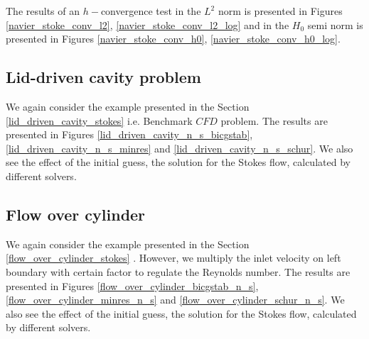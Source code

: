 \documentclass[a4paper]{book}
\begin{document}
The results of an $h-$convergence test in the $L^2$ norm is presented in Figures \ref{navier_stoke_conv_l2}, \ref{navier_stoke_conv_l2_log} and in the $H_0$ semi norm is presented in Figures \ref{navier_stoke_conv_h0}, \ref{navier_stoke_conv_h0_log}. \\

\subsection{Lid-driven cavity problem} \label{lid_driven_cavity_navier_stokes}

We again consider the example presented in the Section \ref{lid_driven_cavity_stokes} i.e. Benchmark $CFD$ problem. The results are presented in Figures \ref{lid_driven_cavity_n_s_bicgstab}, \ref{lid_driven_cavity_n_s_minres} and \ref{lid_driven_cavity_n_s_schur}. We also see the effect of the initial guess, the solution for the Stokes flow, calculated by different solvers.

\subsection{Flow over cylinder} \label{flow_over_cylinder_navier_stokes}

We again consider the example presented in the Section \ref{flow_over_cylinder_stokes} . However, we multiply the inlet velocity on left boundary with certain factor to regulate the Reynolds number. The results are presented in Figures \ref{flow_over_cylinder_bicgstab_n_s}, \ref{flow_over_cylinder_minres_n_s} and \ref{flow_over_cylinder_schur_n_s}. We also see the effect of the initial guess, the solution for the Stokes flow, calculated by different solvers. 
\end{document}

